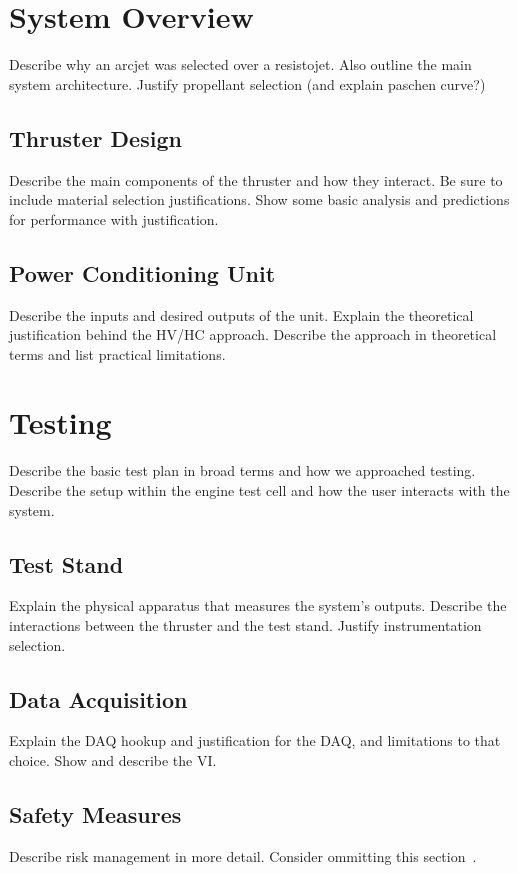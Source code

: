 \documentclass[journal]{IEEEtran}
\begin{document}
\section{System Overview}
Describe why an arcjet was selected over a resistojet.
Also outline the main system architecture.
Justify propellant selection (and explain paschen curve?)

\subsection{Thruster Design}
Describe the main components of the thruster and how they interact. Be sure to include material selection justifications. Show some basic analysis and predictions for performance with justification.

\subsection{Power Conditioning Unit}
Describe the inputs and desired outputs of the unit. Explain the theoretical justification behind the HV/HC approach. Describe the approach in theoretical terms and list practical limitations.

\section{Testing}
Describe the basic test plan in broad terms and how we approached testing. Describe the setup within the engine test cell and how the user interacts with the system.

\subsection{Test Stand}
Explain the physical apparatus that measures the system's outputs. Describe the interactions between the thruster and the test stand. Justify instrumentation selection.

\subsection{Data Acquisition}
Explain the DAQ hookup and justification for the DAQ, and limitations to that choice. Show and describe the VI\@.

\subsection{Safety Measures}
Describe risk management in more detail. Consider ommitting this section~\cite{linden}.
\end{document}
